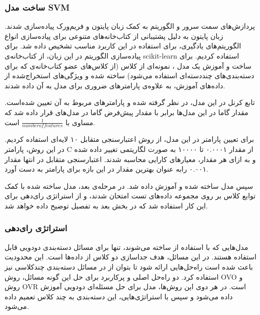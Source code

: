 		
		\subsubsection{ساخت مدل SVM}
پردازش‌های سمت سرور و الگوریتم  به کمک زبان پایتون و فریم‌ورک  پیاده‌سازی شدند. زبان پایتون به دلیل پشتیبانی از کتاب‌خانه‌های متنوعی برای پیاده‌سازی انواع الگوریتم‌های یادگیری، برای استفاده در این کاربرد مناسب تشخیص داده شد. برای پیاده‌سازی الگوریتم  در این زبان، از کتاب‌خانه‌ی scikit-learn استفاده کردیم. برای ساخت و آموزش یک مدل ، نمونه‌ای از کلاس  (از کلاس‌های عضو کتاب‌خانه‌ی  که برای دسته‌بندی‌های چنددسته‌ای استفاده می‌شود) ساخته شده و ویژگی‌های استخراج‌شده از داده‌های آموزش، به علاوه‌ی پارامترهای ضروری برای مدل  به آن داده شدند. 

	تابع کرنل در این مدل،  در نظر گرفته شده و پارامترهای مربوط به آن تعیین شده‌است. مقدار گاما در این مدل‌ها برابر با مقدار پیش‌فرض گاما در مدل‌های  قرار داده شد که مساوی با $\frac{1}{number of features}$ است.
	
برای تعیین پارامتر  در این مدل، از روش اعتبارسنجی متقابل ۱۰ لایه‌ای استفاده کردیم. در این روش، پارامتر C از مقدار ۰.۰۰۰۱ تا ۱۰۰۰۰ به صورت لگاریتمی تغییر داده شده و به ازای هر مقدار، معیارهای کارایی محاسبه شدند. اعتبارسنجی متقابل در انتها مقدار ۰.۰۰۱ رابه عنوان بهترین مقدار در این بازه برای پارامتر  به دست آورد.
 
سپس مدل ساخته شده و آموزش داده شد. در مرحله‌ی بعد، مدل ساخته شده با کمک توابع کلاس  بر روی مجموعه‌ داده‌های تست امتحان شدند، و از استراتژی رای‌دهی  برای این کار استفاده شد که در بخش بعد به تفصیل توضیح داده خواهد شد.
	
		\subsubsection{استراتژی رای‌دهی}
		مدل‌هایی که با استفاده از  ساخته می‌شوند، تنها برای مسائل دسته‌بندی دودویی قابل استفاده هستند. در این مسائل، هدف جداسازی دو کلاس از داده‌ها است. این محدودیت باعث شده است راه‌حل‌هایی ارائه شود تا بتوان از  در مسائل دسته‌بندی چندکلاسی نیز استفاده کرد. دو راه‌حل اصلی و پرکاربرد برای حل این گونه مسائل، روش OVO و روش OVR است. در هر دوی این روش‌ها، مدل  برای حل مسئله‌ای دودویی آموزش داده می‌شود و سپس با استراتژی‌هایی،‌ این دسته‌بندی به چند کلاس تعمیم داده می‌شود.
		 
